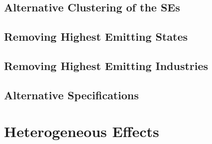\documentclass[12pt, english]{article}
\begin{document}
    \subsection{Alternative Clustering of the SEs}\label{subsec:alternative-clustering-of-the-ses}
    
    
    
    

    \subsection{Removing Highest Emitting States}\label{subsec:removing-highest-emitting-states}

    \subsection{Removing Highest Emitting Industries}\label{subsec:removing-highest-emitting-industries}

    \subsection{Alternative Specifications}\label{subsec:alternative-specifications}


    \section{Heterogeneous Effects}\label{sec:heterogeneous-effects}
\end{document}
